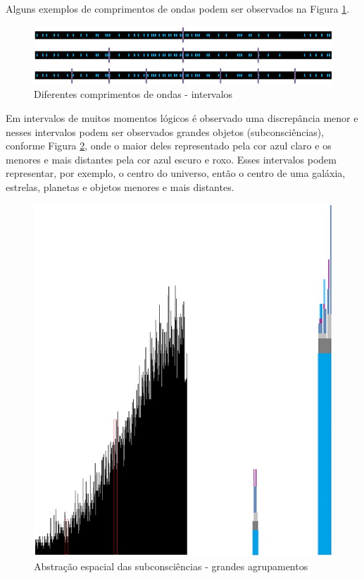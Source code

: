 Alguns exemplos de comprimentos de ondas podem ser observados na Figura \ref{fig:consciousness_space_subconsciousness_examples}.
	\begin{figure}[H]
	\caption{Diferentes comprimentos de ondas - intervalos}
	\label{fig:consciousness_space_subconsciousness_examples}
	\centering
	\includegraphics[scale=.7]{sections/images/consciousness_space_subconsciousness_examples.jpg}
	\end{figure}

Em intervalos de muitos momentos lógicos é observado uma discrepância menor e nesses intervalos podem ser observados grandes objetos (subconsciências), conforme Figura \ref{fig:consciousness_space_subconsciousness}, onde o maior deles representado pela cor azul claro e os menores e mais distantes pela cor azul escuro e roxo. Esses intervalos podem representar, por exemplo, o centro do universo, então o centro de uma galáxia, estrelas, planetas e objetos menores e mais distantes.
	\begin{figure}[H]
	\caption{Abstração espacial das subconsciências - grandes agrupamentos}
	\label{fig:consciousness_space_subconsciousness}
	\centering
	\includegraphics[scale=.45]{sections/images/consciousness_space_subconsciousness.jpg}
	\end{figure}

